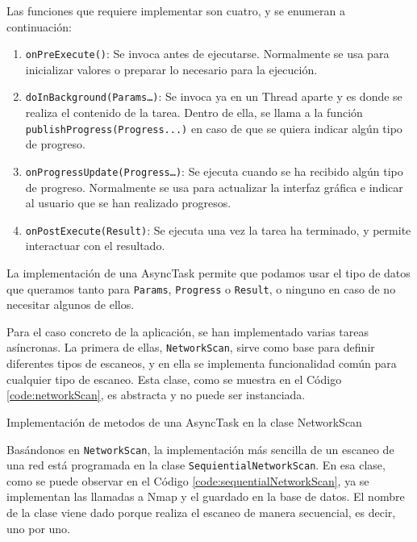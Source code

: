Las funciones que requiere implementar son cuatro, y se enumeran a continuación:

\begin{enumerate}
	\item \texttt{onPreExecute()}: Se invoca antes de ejecutarse. Normalmente se usa para inicializar valores o preparar lo necesario para la ejecución.
	\item \texttt{doInBackground(Params…)}: Se invoca ya en un Thread aparte y es donde se realiza el contenido de la tarea. Dentro de ella, se llama a la función \linebreak \texttt{publishProgress(Progress...)} en caso de que se quiera indicar algún tipo de progreso.
	\item \texttt{onProgressUpdate(Progress…)}: Se ejecuta cuando se ha recibido algún tipo de progreso. Normalmente se usa para actualizar la interfaz gráfica e indicar al usuario que se han realizado progresos.
	\item \texttt{onPostExecute(Result)}: Se ejecuta una vez la tarea ha terminado, y permite interactuar con el resultado.
\end{enumerate}

La implementación de una AsyncTask permite que podamos usar el tipo de datos que queramos tanto para \texttt{Params}, \texttt{Progress} o \texttt{Result}, o ninguno en caso de no necesitar algunos de ellos.

Para el caso concreto de la aplicación, se han implementado varias tareas asíncronas. La primera de ellas, \texttt{NetworkScan}, sirve como base para definir diferentes tipos de escaneos, y en ella se implementa funcionalidad común para cualquier tipo de escaneo. Esta clase, como se muestra en el Código \ref{code:networkScan}, es abstracta y no puede ser instanciada.

\begin{code}
	\caption{Implementación de metodos de una AsyncTask en la clase NetworkScan}
	\label{code:networkScan}
	
\end{code}

Basándonos en \texttt{NetworkScan}, la implementación más sencilla de un escaneo de una red está programada en la clase \texttt{SequientialNetworkScan}. En esa clase, como se puede observar en el Código \ref{code:sequentialNetworkScan}, ya se implementan las llamadas a Nmap y el guardado en la base de datos. El nombre de la clase viene dado porque realiza el escaneo de manera secuencial, es decir, uno por uno.

